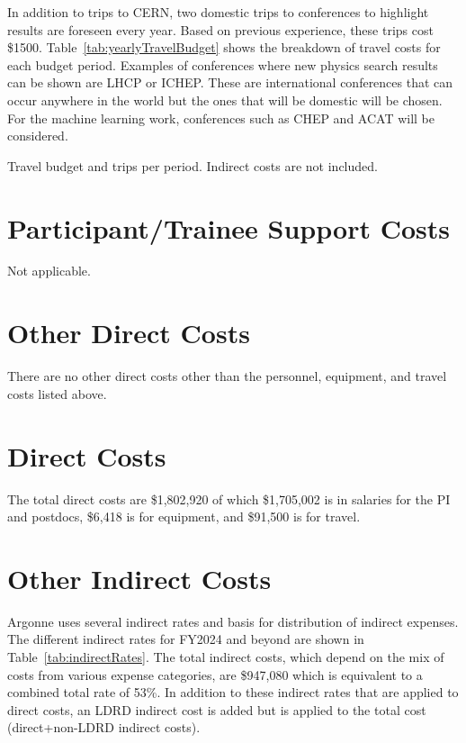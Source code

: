 \documentclass[letter, USenglish, 11pt, subfigure]{article}
\begin{document}
In addition to trips to CERN, two domestic trips to conferences to highlight results are foreseen every year. Based on previous experience, these trips cost \$1500. Table~\ref{tab:yearlyTravelBudget} shows the breakdown of travel costs for each budget period. Examples of conferences where new physics search results can be shown are LHCP or ICHEP. These are international conferences that can occur anywhere in the world but the ones that will be domestic will be chosen. For the machine learning work, conferences such as CHEP and ACAT will be considered. 

\begin{table}[!htpb]
  \begin{center}  
    \caption{Travel budget and trips per period. Indirect costs are not included.}
    \label{tab:yearlyTravelBudget}
  
  \end{center}
\end{table}

\section{Participant/Trainee Support Costs}
\label{subsec:trainee}
Not applicable.

\section{Other Direct Costs}
\label{subsec:otherDirects}
There are no other direct costs other than the personnel, equipment, and travel costs listed above.

\section{Direct Costs}
\label{subsec:directs}
The total direct costs are \$1,802,920 of which \$1,705,002 is in salaries for the PI and postdocs, \$6,418 is for equipment, and \$91,500 is for travel.

\section{Other Indirect Costs}
\label{subsec:otherIndirects}
Argonne uses several indirect rates and basis for distribution of indirect expenses. The different indirect rates for FY2024 and beyond are shown in Table~\ref{tab:indirectRates}. The total indirect costs, which depend on the mix of costs from various expense categories, are \$947,080 which is equivalent to a combined total rate of 53\%. In addition to these indirect rates that are applied to direct costs, an LDRD indirect cost is added but is applied to the total cost (direct+non-LDRD indirect costs).
\end{document}
